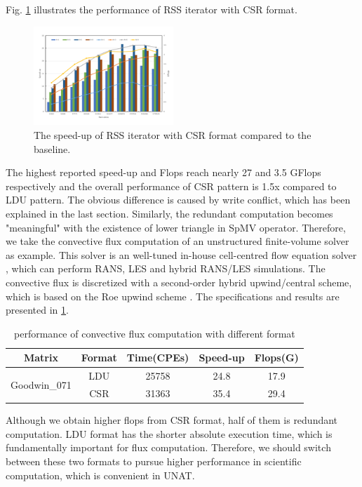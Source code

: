 \documentclass[conference]{IEEEtran}
\begin{document}
Fig. \ref{rsscsr} illustrates the performance of RSS iterator with CSR format.
\begin{figure}[tbp]
\centerline{\includegraphics[width=0.47\textwidth]{rss(csr).pdf}}
\caption{The speed-up of RSS iterator with CSR format compared to the baseline.}
\label{rsscsr}
\end{figure}
The highest reported speed-up and Flops reach nearly 27 and 3.5 GFlops respectively and the overall performance of CSR pattern is 1.5x compared to LDU pattern. The obvious difference is caused by write conflict, which has been explained in the last section. Similarly, the redundant computation becomes "meaningful" with the existence of lower triangle in SpMV operator. Therefore, we take the convective flux computation of an unstructured finite-volume solver as example. This solver is an well-tuned in-house cell-centred flow equation solver \cite{b13}\cite{b14}, which can perform RANS, LES and hybrid RANS/LES simulations. The convective flux is discretized with a second-order hybrid upwind/central scheme, which is based on the Roe upwind scheme \cite{b15}. The specifications and results are presented in \ref{umbt_conv}.
\begin{table}[]
\caption{performance of convective flux computation with different format}
\begin{tabular}{|c|c|c|c|c|}
\hline
Matrix                        & Format & Time(CPEs) & Speed-up & Flops(G) \\ \hline
\multirow{2}{*}{Goodwin\_071} & LDU    & 25758      & 24.8     & 17.9     \\ \cline{2-5} 
                              & CSR    & 31363      & 35.4     & 29.4     \\ \hline
\end{tabular}
\label{umbt_conv}
\end{table}
Although we obtain higher flops from CSR format, half of them is redundant computation. LDU format has the shorter absolute execution time, which is fundamentally important for flux computation. Therefore, we should switch between these two formats to pursue higher performance in scientific computation, which is convenient in UNAT.
\end{document}
